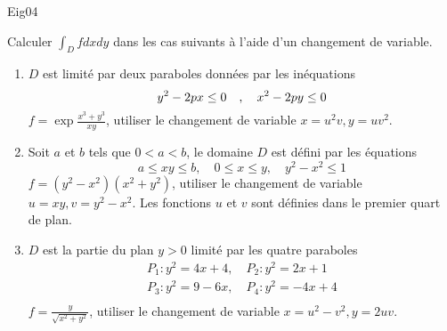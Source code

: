 \begin{tiny}Eig04\end{tiny}
Calculer $\int_D f dxdy$ dans les cas suivants {\`a} l'aide d'un changement de variable.
    \begin{enumerate}
        \item $D$ est limit{\'e} par deux paraboles donn{\'e}es par les in{\'e}quations
            \[y^2-2px\leq 0\quad,\quad    x^2-2py \leq 0\\\]
            $f=\exp\frac{x^3+y^3}{xy}$, utiliser le changement de
            variable $x=u^2v,y=uv^2$.
        \item Soit $a$ et $b$ tels que $0<a<b$, le domaine $D$ est
        d{\'e}fini par les {\'e}quations
        \[a\leq xy \leq b,\quad 0\leq x \leq y,\quad y^2-x^2\leq 1\]
        $f=(y^2-x^2)(x^2+y^2)$, utiliser le changement de variable
        $u=xy,v=y^2-x^2$.\newline
Les fonctions $u$ et $v$ sont définies dans le premier quart de plan.
        \item $D$ est la partie du plan $y>0$ limit{\'e} par les quatre paraboles
        \begin{eqnarray*}
            P_1:y^2=4x+4,\quad P_2:y^2=2x+1\\
            P_3:y^2=9-6x,\quad P_4:y^2=-4x+4\\
        \end{eqnarray*}
        $f=\frac{y}{\sqrt{x^2+y^2}}$, utiliser le changement de variable $x=u^2-v^2,y=2uv$.
    \end{enumerate}
